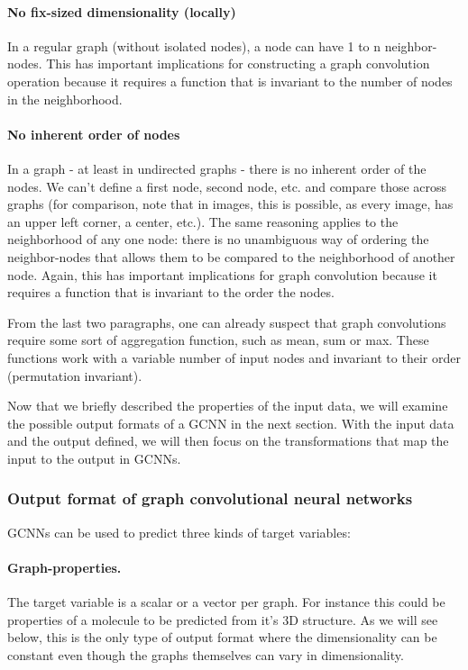 \paragraph{No fix-sized dimensionality (locally)}
In a regular graph (without isolated nodes), a node can have 1 to n neighbor-nodes. This has important implications for constructing a graph convolution operation because it requires a function that is invariant to the number of nodes in the neighborhood. 
\paragraph{No inherent order of nodes}
In a graph - at least in undirected graphs - there is no inherent order of the nodes. We can't define a first node, second node, etc. and compare those across graphs (for comparison, note that in images, this is possible, as every image, has an upper left corner, a center, etc.). The same reasoning applies to the neighborhood of any one node: there is no unambiguous way of ordering the neighbor-nodes that allows them to be compared to the neighborhood of another node. Again, this has important implications for graph convolution because it requires a function that is invariant to the order the nodes.

From the last two paragraphs, one can already suspect that graph convolutions require some sort of aggregation function, such as mean, sum or max. These functions work with a variable number of input nodes and invariant to their order (permutation invariant).

Now that we briefly described the properties of the input data, we will examine the possible output formats of a GCNN in the next section. With the input data and the output defined, we will then focus on the transformations that map the input to the output in GCNNs.

\subsubsection{Output format of graph convolutional neural networks}
\label{sec:graph-output}

GCNNs can be used to predict three kinds of target variables:

\paragraph{Graph-properties.}
The target variable is a scalar or a vector per graph. For instance this could be properties of a molecule to be predicted from it's 3D structure. As we will see below, this is the only type of output format where the dimensionality can be constant even though the graphs themselves can vary in dimensionality.
